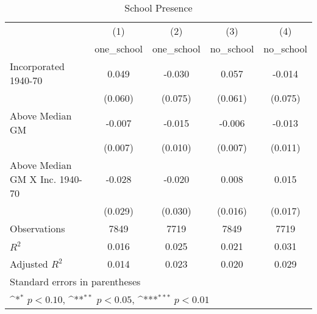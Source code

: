 \begin{table}[htbp]\centering
\def\sym#1{\ifmmode^{#1}\else\(^{#1}\)\fi}
\caption{School Presence}
\begin{tabular}{l*{4}{c}}
\hline\hline
                    &\multicolumn{1}{c}{(1)}&\multicolumn{1}{c}{(2)}&\multicolumn{1}{c}{(3)}&\multicolumn{1}{c}{(4)}\\
                    &\multicolumn{1}{c}{one\_school}&\multicolumn{1}{c}{one\_school}&\multicolumn{1}{c}{no\_school}&\multicolumn{1}{c}{no\_school}\\
\hline
Incorporated 1940-70&       0.049         &      -0.030         &       0.057         &      -0.014         \\
                    &     (0.060)         &     (0.075)         &     (0.061)         &     (0.075)         \\
[1em]
Above Median GM     &      -0.007         &      -0.015         &      -0.006         &      -0.013         \\
                    &     (0.007)         &     (0.010)         &     (0.007)         &     (0.011)         \\
[1em]
Above Median GM X Inc. 1940-70&      -0.028         &      -0.020         &       0.008         &       0.015         \\
                    &     (0.029)         &     (0.030)         &     (0.016)         &     (0.017)         \\
\hline
Observations        &        7849         &        7719         &        7849         &        7719         \\
\(R^{2}\)           &       0.016         &       0.025         &       0.021         &       0.031         \\
Adjusted \(R^{2}\)  &       0.014         &       0.023         &       0.020         &       0.029         \\
\hline\hline
\multicolumn{5}{l}{\footnotesize Standard errors in parentheses}\\
\multicolumn{5}{l}{\footnotesize \sym{*} \(p<0.10\), \sym{**} \(p<0.05\), \sym{***} \(p<0.01\)}\\
\end{tabular}
\end{table}

